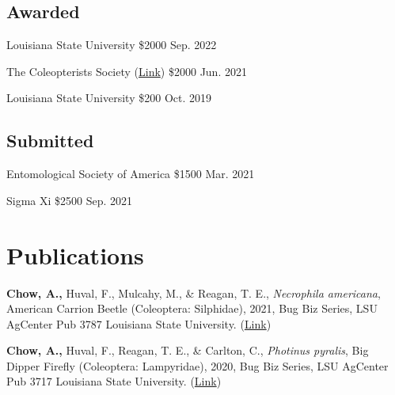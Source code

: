 \documentclass{article}
\newcommand{\hindent}{\hangindent=10pt}
\begin{document}
\subsection{Awarded}
{Louisiana State University}
{\$2000} 
{Sep. 2022} %

{The Coleopterists Society 
    (\href{https://www.coleopsoc.org/society-info/prizes-and-awards/graduate-student-research-enhancement-award/}{Link})
}
{\$2000} 
{Jun. 2021} %

{Louisiana State University} 
{\$200}
{Oct. 2019} %

\subsection{Submitted}

{Entomological Society of America} 
{\$1500}
{Mar. 2021}

{Sigma Xi} 
{\$2500}
{Sep. 2021}

\section{Publications}
\newcommand{\BugBiz}[5]{
    \noindent
    \hindent
    {#1} %
    {#2}, %
    {#3}, %
    Bug Biz Series, LSU AgCenter Pub 
    {#4}
    Louisiana State University.
    (\href{#5}{Link}) %
}

\BugBiz{\textbf{\textbf{Chow, A.,}} Huval, F., Mulcahy, M., \& Reagan, T. E.,}
{\textit{Necrophila americana}, American Carrion Beetle (Coleoptera: Silphidae)}
{2021}
{3787}
{https://www.lsuagcenter.com/articles/page1619566292701}

\BugBiz{\textbf{\textbf{Chow, A.,}} Huval, F., Reagan, T. E., \& Carlton, C.,}
{\textit{Photinus pyralis}, Big Dipper Firefly (Coleoptera: Lampyridae)}
{2020}
{3717}
{https://www.lsuagcenter.com/profiles/bneely/articles/page1587050468972}
\end{document}
